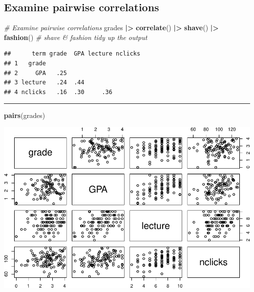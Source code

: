 \documentclass[
]{article}
\newenvironment{Shaded}{\begin{snugshade}}{\end{snugshade}}
\newcommand{\CommentTok}[1]{\textcolor[rgb]{0.56,0.35,0.01}{\textit{#1}}}
\newcommand{\FunctionTok}[1]{\textcolor[rgb]{0.13,0.29,0.53}{\textbf{#1}}}
\newcommand{\NormalTok}[1]{#1}
\newcommand{\SpecialCharTok}[1]{\textcolor[rgb]{0.81,0.36,0.00}{\textbf{#1}}}
\begin{document}
\hypertarget{examine-pairwise-correlations}{%
\subsection{Examine pairwise
correlations}\label{examine-pairwise-correlations}}

\begin{Shaded}
\begin{Highlighting}[]
\CommentTok{\# Examine pairwise correlations}
\NormalTok{grades }\SpecialCharTok{|\textgreater{}}
  \FunctionTok{correlate}\NormalTok{() }\SpecialCharTok{|\textgreater{}}
  \FunctionTok{shave}\NormalTok{() }\SpecialCharTok{|\textgreater{}} 
  \FunctionTok{fashion}\NormalTok{() }\CommentTok{\# shave \& fashion tidy up the output}
\end{Highlighting}
\end{Shaded}

\begin{verbatim}
##      term grade  GPA lecture nclicks
## 1   grade                           
## 2     GPA   .25                     
## 3 lecture   .24  .44                
## 4 nclicks   .16  .30     .36
\end{verbatim}

\begin{center}\rule{0.5\linewidth}{0.5pt}\end{center}

\begin{Shaded}
\begin{Highlighting}[]
\FunctionTok{pairs}\NormalTok{(grades)}
\end{Highlighting}
\end{Shaded}

\includegraphics{L9_Multiple_regression_pdf_files/figure-latex/unnamed-chunk-4-1.pdf}
\end{document}
